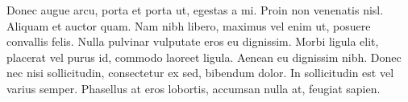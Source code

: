 Donec augue arcu, porta et porta ut, egestas a mi. Proin non venenatis nisl. Aliquam et auctor quam. Nam nibh libero, maximus vel enim ut, posuere convallis felis. Nulla pulvinar vulputate eros eu dignissim. Morbi ligula elit, placerat vel purus id, commodo laoreet ligula. Aenean eu dignissim nibh. Donec nec nisi sollicitudin, consectetur ex sed, bibendum dolor. In sollicitudin est vel varius semper. Phasellus at eros lobortis, accumsan nulla at, feugiat sapien.